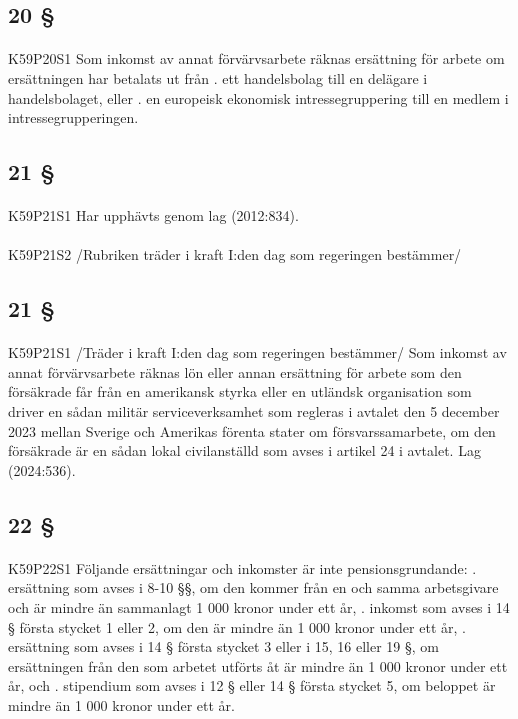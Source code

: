 \documentclass[a4paper,notitlepage,openany,10pt]{book}
\begin{document}
\subsection*{20 §}
\paragraph*{}
{\tiny K59P20S1}
Som inkomst av annat förvärvsarbete räknas ersättning för arbete om ersättningen har betalats ut från
. ett handelsbolag till en delägare i handelsbolaget, eller
. en europeisk ekonomisk intressegruppering till en medlem i intressegrupperingen.
\subsection*{21 §}
\paragraph*{}
{\tiny K59P21S1}
Har upphävts genom
lag (2012:834).
\paragraph*{}
{\tiny K59P21S2}
/Rubriken träder i kraft I:den dag som regeringen bestämmer/
\subsection*{21 §}
\paragraph*{}
{\tiny K59P21S1}
/Träder i kraft I:den dag som regeringen bestämmer/
Som inkomst av annat förvärvsarbete räknas lön eller annan ersättning för arbete som den försäkrade får från en amerikansk styrka eller en utländsk organisation som driver en sådan militär serviceverksamhet som regleras i avtalet den 5 december 2023 mellan Sverige och Amerikas förenta stater om försvarssamarbete, om den försäkrade är en sådan lokal civilanställd som avses i artikel 24 i avtalet.
Lag (2024:536).
\subsection*{22 §}
\paragraph*{}
{\tiny K59P22S1}
Följande ersättningar och inkomster är inte pensionsgrundande:
. ersättning som avses i 8-10 §§, om den kommer från en och samma arbetsgivare och är mindre än sammanlagt 1 000 kronor under ett år,
. inkomst som avses i 14 § första stycket 1 eller 2, om den är mindre än 1 000 kronor under ett år,
. ersättning som avses i 14 § första stycket 3 eller i 15, 16 eller 19 §, om ersättningen från den som arbetet utförts åt är mindre än 1 000 kronor under ett år, och
. stipendium som avses i 12 § eller 14 § första stycket 5, om beloppet är mindre än 1 000 kronor under ett år.
\end{document}
